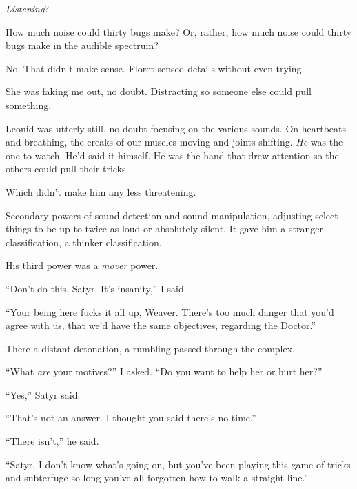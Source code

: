 \emph{Listening}?



How much noise could thirty bugs make?  Or, rather, how much noise could thirty bugs make in the audible spectrum?



No.  That didn't make sense.  Floret sensed details without even trying.



She was faking me out, no doubt.  Distracting so someone else could pull something.



Leonid was utterly still, no doubt focusing on the various sounds.  On heartbeats and breathing, the creaks of our muscles moving and joints shifting.  \emph{He} was the one to watch.  He'd said it himself.  He was the hand that drew attention so the others could pull their tricks.



Which didn't make him any less threatening.



Secondary powers of sound detection and sound manipulation, adjusting select things to be up to twice as loud or absolutely silent.  It gave him a stranger classification, a thinker classification.



His third power was a \emph{mover} power.



``Don't do this, Satyr.  It's insanity,'' I said.



``Your being here fucks it all up, Weaver.  There's too much danger that you'd agree with us, that we'd have the same objectives, regarding the Doctor.''



There a distant detonation, a rumbling passed through the complex.



``What \emph{are} your motives?'' I asked.  ``Do you want to help her or hurt her?''



``Yes,'' Satyr said.



``That's not an answer.  I thought you said there's no time.''



``There isn't,'' he said.



``Satyr, I don't know what's going on, but you've been playing this game of tricks and subterfuge so long you've all forgotten how to walk a straight line.''



